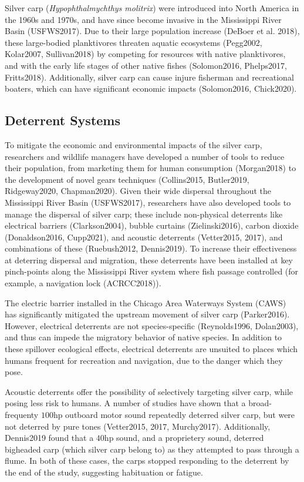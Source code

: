 \documentclass[12pt]{article}
\begin{document}
Silver carp (\emph{Hypophthalmychthys molitrix}) were introduced into North America in the 1960s and 1970s, and have since become invasive in the Mississippi River Basin (USFWS2017). Due to their large population increase (DeBoer et al. 2018), these large-bodied planktivores threaten aquatic ecosystems (Pegg2002, Kolar2007, Sullivan2018) by competing for resources with native planktivores, and with the early life stages of other native fishes (Solomon2016, Phelps2017, Fritts2018).  Additionally, silver carp can cause injure fisherman and recreational boaters, which can have significant economic impacts (Solomon2016, Chick2020).

\subsection{Deterrent Systems}

To mitigate the economic and environmental impacts of the silver carp, researchers and wildlife managers have developed a number of tools to reduce their population, from marketing them for human consumption (Morgan2018) to the development of novel gears techniques (Collins2015, Butler2019, Ridgeway2020, Chapman2020). Given their wide dispersal throughout the Mississippi River Basin (USFWS2017), researchers have also developed tools to manage the dispersal of silver carp; these include non-physical deterrents like electrical barriers (Clarkson2004), bubble curtains (Zielinski2016), carbon dioxide (Donaldson2016, Cupp2021), and acoustic deterrents (Vetter2015, 2017), and combinations of these (Ruebush2012, Dennis2019). To increase their effectiveness at deterring dispersal and migration, these deterrents have been installed at key pinch-points along the Mississippi River system  where fish passage controlled (for example, a navigation lock (ACRCC2018)).

The electric barrier installed in the Chicago Area Waterways System (CAWS) has significantly mitigated the upstream movement of silver carp (Parker2016). However, electrical deterrents are not species-specific (Reynolds1996, Dolan2003), and thus can impede the migratory behavior of native species. In addition to these spillover ecological effects, electrical deterrents are unsuited to places which humans frequent for recreation and navigation, due to the danger which they pose.

Acoustic deterrents offer the possibility of selectively targeting silver carp, while posing less risk to humans. A number of studies have shown that a broad-frequenty $100$hp outboard motor sound repeatedly deterred silver carp, but were not deterred by pure tones (Vetter2015, 2017, Murchy2017). Additionally, Dennis2019 found that a $40$hp sound, and a proprietery sound, deterred bigheaded carp (which silver carp belong to) as they attempted to pass through a flume. In both of these cases, the carps stopped responding to the deterrent by the end of the study, suggesting habituation or fatigue.
\end{document}

